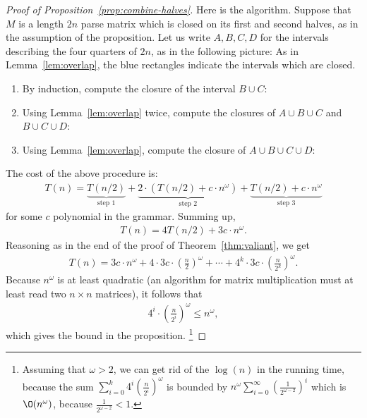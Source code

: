 \begin{proof}[Proof of Proposition~\ref{prop:combine-halves}]
	Here is the algorithm. Suppose that $M$ is a length $2n$ parse matrix which is closed on its first and second halves, as in the assumption of the proposition. Let us write $A,B,C,D$ for the intervals describing the four quarters of $2n$, as in the following picture: 
As in Lemma~\ref{lem:overlap},	the blue rectangles indicate the intervals which are closed. 
	\begin{enumerate}
	\item By induction,  compute the closure of the interval $B \cup C$:
		\item 	Using Lemma~\ref{lem:overlap} twice,   compute the closures of $A \cup B \cup C$ and  $B \cup C \cup D$:
		\item Using Lemma~\ref{lem:overlap}, compute the closure of $A \cup B \cup C \cup D$:
	\end{enumerate}
The cost of the above procedure is:
\begin{align*}
  T(n) = \underbrace{T(n/2)}_{\text{step 1}} +  \underbrace{2 \cdot (T(n/2) + c \cdot n^\omega)}_{\text{step 2}} + \underbrace{T(n/2) +  c \cdot n^\omega}_{\text{step 3}} 
\end{align*}
for some $c$ polynomial in the grammar. Summing up,
\begin{align*}
T(n) =   4T(n/2) + 3c \cdot n^\omega.
\end{align*}
Reasoning as in the end of the proof of Theorem~\ref{thm:valiant}, we get
\begin{align*}
  T(n) = 3c \cdot n^\omega + 4 \cdot 3c \cdot (\frac n 2)^\omega + \cdots + 4^k \cdot 3c \cdot (\frac n {2^k})^\omega.
\end{align*}	
Because $n^\omega$ is at least quadratic (an algorithm for matrix multiplication must at least read two  $n \times n$ matrices), it follows that 
\begin{align*}
  4^i  \cdot (\frac n {2^i})^\omega \le     n^\omega,
\end{align*}
which gives the bound in the proposition.
\footnote{
\label{footnote:log}
Assuming that $\omega > 2$, we can get rid of the $\log(n)$ in the running time, because the sum
$\sum_{i=0}^{k} 4^i (\frac{n}{2^i})^{\omega}$
is bounded by
$n^{\omega}\sum_{i=0}^{\infty} (\frac{1}{2^{\omega - 2}})^{i}$
which is $\O(n^{\omega})$, because
$\frac{1}{2^{\omega - 2}} < 1$.
}
\end{proof}

